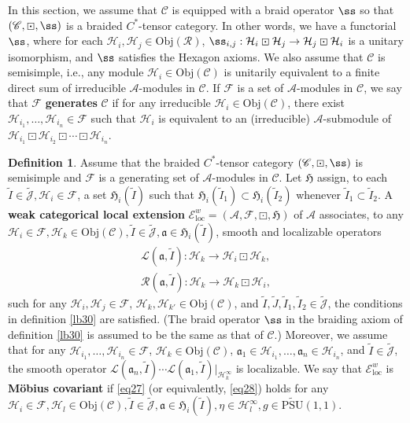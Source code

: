 \documentclass[12pt,a4paper]{article}
\theoremstyle{definition}
\newtheorem{df}{Definition}[subsection]
\theoremstyle{plain}
\newcommand{\fk}{\mathfrak}
\newcommand{\mc}{\mathcal}
\newcommand{\wtd}{\widetilde}
\newcommand{\loc}{\mathrm{loc}}
\newcommand{\UPSU}{\widetilde{\mathrm{PSU}}(1,1)}
\newcommand{\scr}{\mathscr}
\newcommand{\Jtd}{\widetilde{\mathcal J}}
\newcommand{\Obj}{\mathrm{Obj}}
\numberwithin{equation}{subsection}
\begin{document}
In this section, we assume that $\scr C$ is equipped with a braid operator $\ss$ so that $(\scr C,\boxdot,\ss)$ is a braided $C^*$-tensor category. In other words, we have a functorial $\ss$, where for each $\mc H_i,\mc H_j\in\Obj(\scr R)$, $\ss_{i,j}:\mc H_i\boxdot\mc H_j\rightarrow\mc H_j\boxdot\mc H_i$ is a unitary isomorphism, and $\ss$ satisfies the Hexagon axioms.  We also assume that $\scr C$  is semisimple, i.e., any module $\mc H_i\in\Obj(\scr C)$ is unitarily equivalent to a finite direct sum of irreducible $\mc A$-modules in $\scr C$. If $\mc F$ is a set of  $\mc A$-modules in $\scr C$, we say that $\mc F$ \textbf{generates} $\scr C$ if for any irreducible $\mc H_i\in\Obj(\scr C)$, there exist $\mc H_{i_1},\dots,\mc H_{i_n}\in\mc F$ such that $\mc H_i$ is equivalent to an (irreducible) $\mc A$-submodule of $\mc H_{i_1}\boxdot\mc H_{i_2}\boxdot\cdots\boxdot\mc H_{i_n}$.

\begin{df}\label{lb31}
	Assume that the braided $C^*$-tensor category $(\scr C,\boxdot,\ss)$ is semisimple and $\mc F$ is a generating set of  $\mc A$-modules in $\scr C$. Let $\fk H$ assign, to each $\wtd I\in\Jtd,\mc H_i\in\mc F$, a set $\fk H_i(\wtd I)$ such that $\fk H_i(\wtd I_1)\subset\fk H_i(\wtd I_2)$ whenever $\wtd I_1\subset\wtd I_2$. A \textbf{weak categorical local extension} $\scr E^w_\loc=(\mc A,\mc F,\boxdot,\fk H)$ of $\mc A$ associates, to any $\mc H_i\in\mc F,\mc H_k\in\Obj(\scr C),\wtd I\in\Jtd,\fk a\in\fk H_i(\wtd I)$, smooth and localizable operators
	\begin{gather*}	
	\mc L(\fk a,\wtd I):\mc H_k\rightarrow\mc H_i\boxdot\mc H_k,\\
	\mc R(\fk a,\wtd I):\mc H_k\rightarrow\mc H_k\boxdot\mc H_i,
	\end{gather*}
	such for any $\mc H_i,\mc H_j\in\mc F$, $\mc H_k,\mc H_{k'}\in\Obj(\scr C)$, and  $\wtd I,\wtd J,\wtd I_1,\wtd I_2\in\Jtd$, the conditions in definition \ref{lb30} are satisfied. (The braid operator $\ss$ in the braiding axiom of definition \ref{lb30} is assumed to be the same as that of $\scr C$.) Moreover, we assume that for any $\mc H_{i_1},\dots,\mc H_{i_n}\in\mc F$, $\mc H_k\in\Obj(\scr C)$, $\fk a_1\in\mc H_{i_1},\dots,\fk a_n\in\mc H_{i_n}$, and $\wtd I\in\Jtd$, the smooth operator $\mc L(\fk a_n,\wtd I)\cdots\mc L(\fk a_1,\wtd I)|_{\mc H_k^\infty}$ is localizable. We say that $\scr E^w_{\loc}$ is \textbf{M\"obius covariant} if \eqref{eq27} (or equivalently, \eqref{eq28}) holds for any $\mc H_i\in\mc F,\mc H_l\in\Obj(\scr C),\wtd I\in\Jtd,\fk a\in\fk H_i(\wtd I),\eta\in\mc H_l^\infty,g\in\UPSU$.
\end{df}
\end{document}
